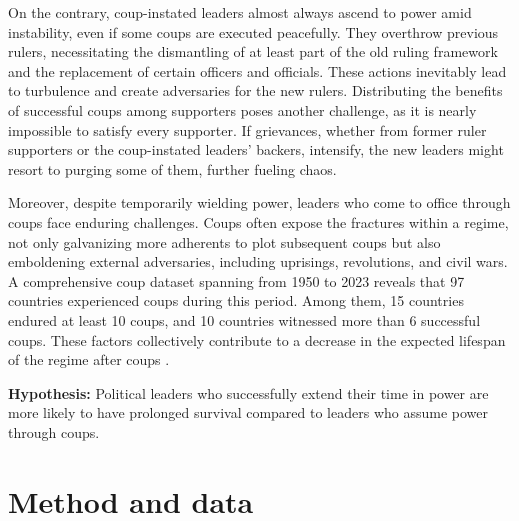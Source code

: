 \documentclass[
  12pt,
  a4paper,
  12pt]{article}
\begin{document}
On the contrary, coup-instated leaders almost always ascend to power
amid instability, even if some coups are executed peacefully. They
overthrow previous rulers, necessitating the dismantling of at least
part of the old ruling framework and the replacement of certain officers
and officials. These actions inevitably lead to turbulence and create
adversaries for the new rulers. Distributing the benefits of successful
coups among supporters poses another challenge, as it is nearly
impossible to satisfy every supporter. If grievances, whether from
former ruler supporters or the coup-instated leaders' backers,
intensify, the new leaders might resort to purging some of them, further
fueling chaos.

Moreover, despite temporarily wielding power, leaders who come to office
through coups face enduring challenges. Coups often expose the fractures
within a regime, not only galvanizing more adherents to plot subsequent
coups but also emboldening external adversaries, including uprisings,
revolutions, and civil wars. A comprehensive coup dataset
\citep{powell2011} spanning from 1950 to 2023 reveals that 97 countries
experienced coups during this period. Among them, 15 countries endured
at least 10 coups, and 10 countries witnessed more than 6 successful
coups. These factors collectively contribute to a decrease in the
expected lifespan of the regime after coups \citep{dahl2023}.

\textbf{Hypothesis:} Political leaders who successfully extend their
time in power are more likely to have prolonged survival compared to
leaders who assume power through coups.

\hypertarget{method-and-data}{%
\section{Method and data}\label{method-and-data}}

\newpage


\renewcommand\refname{References}
  
\end{document}
